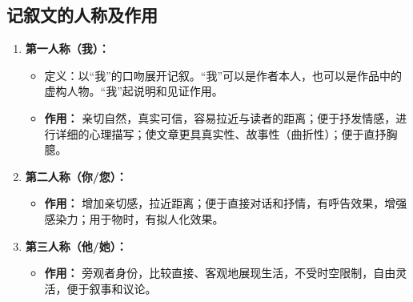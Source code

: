 \documentclass[11pt, a4paper]{ctexart}
\begin{document}
\subsection{记叙文的人称及作用}
\begin{enumerate}
    \item \textbf{第一人称（我）：}
    \begin{itemize}
        \item 定义：以“我”的口吻展开记叙。“我”可以是作者本人，也可以是作品中的虚构人物。“我”起说明和见证作用。
        \item \textbf{作用：} 亲切自然，真实可信，容易拉近与读者的距离；便于抒发情感，进行详细的心理描写；使文章更具真实性、故事性（曲折性）；便于直抒胸臆。
    \end{itemize}
    \item \textbf{第二人称（你/您）：}
    \begin{itemize}
        \item \textbf{作用：} 增加亲切感，拉近距离；便于直接对话和抒情，有呼告效果，增强感染力；用于物时，有拟人化效果。
    \end{itemize}
    \item \textbf{第三人称（他/她）：}
    \begin{itemize}
        \item \textbf{作用：} 旁观者身份，比较直接、客观地展现生活，不受时空限制，自由灵活，便于叙事和议论。
    \end{itemize}
\end{enumerate}
\end{document}
